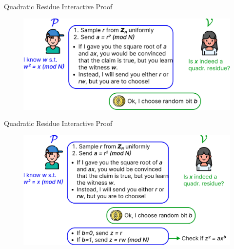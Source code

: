 \documentclass[xcolor={usenames,dvipsnames}]{beamer}
\begin{document}
    \begin{frame}{Quadratic Residue Interactive Proof}
        \begin{figure}
            \centering
            \includegraphics[width=\textwidth]{images/lecture_6/qr_test_3.pdf}
        \end{figure}
    \end{frame}

    \begin{frame}{Quadratic Residue Interactive Proof}
        \begin{figure}
            \centering
            \includegraphics[width=\textwidth]{images/lecture_6/qr_test_4.pdf}
        \end{figure}
    \end{frame}
\end{document}
